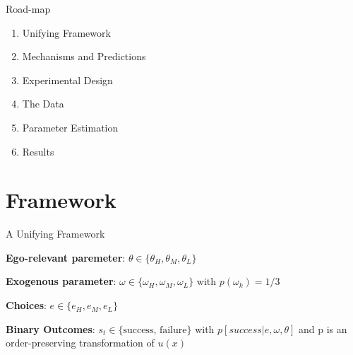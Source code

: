 \documentclass[aspectratio=169]{beamer}
\begin{document}
\begin{frame}{Road-map}
    \begin{enumerate}
        \item Unifying Framework\\
        \bigskip
        \item Mechanisms and Predictions\\
        \bigskip
        \item Experimental Design\\
        \bigskip
        \item The Data\\
        \bigskip
        \item Parameter Estimation\\
        \bigskip
        \item Results\\
    \end{enumerate}
\end{frame}

\section*{Framework}

\begin{frame}{A Unifying Framework}

\textbf{Ego-relevant paremeter}: $\theta \in \{\theta_H, \theta_M, \theta_L\}$\\
\bigskip

\textbf{Exogenous parameter}: $\omega \in \{\omega_H, \omega_M, \omega_L\}$
with $p(\omega_k)=1/3$ \\
\bigskip

\textbf{Choices}: $e \in \{e_H, e_M, e_L\}$\\
\bigskip

\textbf{Binary Outcomes}: $s_t \in\{\text{success, failure}\}$ with  $p\left[success|e, \omega, \theta\right]$ and p is an order-preserving transformation of $u(x)$


\end{frame}
\end{document}

